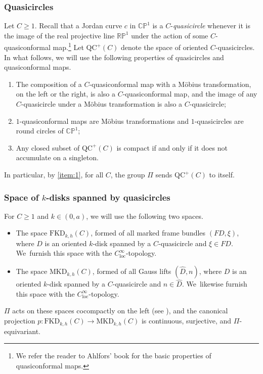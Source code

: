 \documentclass[10pt]{amsart}
\newcommand{\kdisk}{$k$\nobreakdash-disk\xspace}
\newcommand{\kdisks}{$k$\nobreakdash-disks\xspace}
\theoremstyle{plain}
\theoremstyle{definition}
\newcommand\CP{\C\PP^1}
\newcommand\RP{\R\PP^1}
\newcommand{\R}{{\mathbb R}}
\newcommand{\C}{{\mathbb C}}
\newcommand{\PP}{{\mathbb P}}
\newcommand{\loc}{\mathrm{loc}}
\newcommand{\QC}{\mathrm{QC}}
\newcommand{\MKD}{\mathrm{MKD}}
\newcommand{\FKD}{\mathrm{FKD}}
\begin{document}
\subsubsection{Quasicircles}\label{sss.PSL_quasicircles} Let $C\geq 1$. Recall that a Jordan curve $c$ in $\CP$ is a $C$\nobreakdash-\emph{quasicircle} whenever it is the image of the real projective line $\RP$ under the action of some $C$-quasiconformal map.\footnote{We refer the reader to Ahlfors' book \cite{Ahlfors} for the basic properties of quasiconformal maps.} Let $\QC^+(C)$ denote the space of oriented $C$-quasicircles. In what follows, we will use the following properties of quasicircles and quasiconformal maps.
\begin{enumerate}
\item\label{item:1} The composition of a $C$-quasiconformal map with a Möbius transformation, on the left or the right, is also a $C$-quasiconformal map, and the image of any $C$\nobreakdash-quasi\-circle under a Möbius transformation is also a $C$-quasicircle;
\item $1$-quasiconformal maps are Möbius transformations and $1$-quasicircles are round circles of $\CP$;
\item\label{item:3} Any closed subset of $\QC^+(C)$ is compact if and only if it does not accumulate on a singleton.
\end{enumerate}
In particular, by \eqref{item:1}, for all $C$, the group $\Pi$ sends $\QC^+(C)$ to itself.

\subsubsection{Space of \kdisks spanned by quasicircles}
For $C\geq 1$ and $k\in(0,a)$, we will use the following two spaces.
\begin{itemize}
\item The space $\FKD_{k,h}(C)$, formed of all marked frame bundles $(FD,\xi)$, where $D$ is an oriented \kdisk spanned by a $C$-quasicircle and $\xi\in FD$. We~furnish this space with the $C^\infty_\loc$-topology.
\item The space $\MKD_{k,h}(C)$, formed of all Gauss lifts $(\hat D,n)$, where $D$ is an oriented \kdisk spanned by a $C$-quasicircle and $n\in\hat D$. We~likewise furnish this space with the $C^\infty_\loc$-topology.
\end{itemize}
$\Pi$ acts on these spaces cocompactly on the left (see \cite{ALS,LabourieGAFA}), and the canonical projection $p:\FKD_{k,h}(C)\to\MKD_{k,h}(C)$ is continuous, surjective, and $\Pi$-equivariant.
\end{document}
